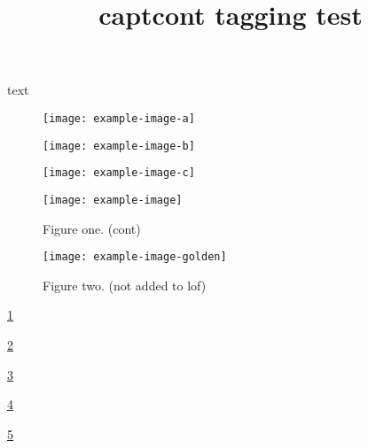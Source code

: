 \documentclass{article}
\title{captcont tagging test}
\begin{document}
\listoffigures

text

\begin{figure}[p]
\texttt{[image: example-image-a]}
\label{fig:ex1-1}
\end{figure}
\begin{figure}[p]
\texttt{[image: example-image-b]}
\label{fig:ex1-2}
\end{figure}
\begin{figure}[p]
\texttt{[image: example-image-c]}
\label{fig:ex1-3}
\end{figure}
\begin{figure}[p]
\texttt{[image: example-image]}
\caption{Figure one. (cont)}
\label{fig:ex1-4}
\end{figure}
\begin{figure}[p]
\texttt{[image: example-image-golden]}
\caption*{Figure two. (not added to lof)}
\label{fig:ex1-5}
\end{figure}

\ref{fig:ex1-1}

\ref{fig:ex1-2}

\ref{fig:ex1-3}

\ref{fig:ex1-4}

\ref{fig:ex1-5}
\end{document}

